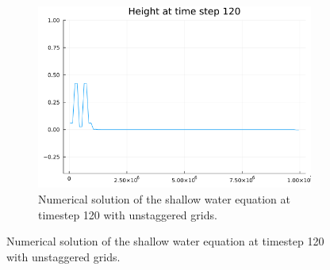 \begin{figure}[h]
\begin{subfigure}[b]{0.3\textwidth}
        \includegraphics[width=\textwidth]{./images/height-swe1d-unstaggered-grid-120.png}
        \caption{Numerical solution of the shallow water equation at timestep 120 with unstaggered grids.}
        \label{fig:unstaggered120}
    \end{subfigure}

    \vspace{0.5cm} %


\end{figure}

